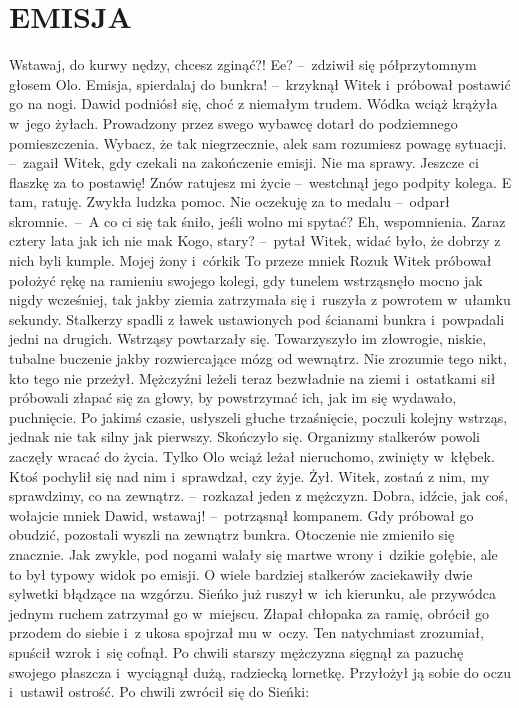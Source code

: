 \documentclass[../MAIN.tex]{subfiles}
\begin{document}
\section*{EMISJA}
\sd
\xx Wstawaj, do kurwy nędzy, chcesz zginąć?!
\xx Ee? --~zdziwił się półprzytomnym głosem Olo.
\xx Emisja, spierdalaj do bunkra! --~krzyknął Witek i~próbował postawić go na nogi.
\qd
\dd
Dawid podniósł się, choć z niemałym trudem. Wódka wciąż krążyła w~jego żyłach. Prowadzony przez swego wybawcę dotarł do podziemnego pomieszczenia.
\dd
\sd
\xx Wybacz, że tak niegrzecznie, ale\3k sam rozumiesz powagę sytuacji. --~zagaił Witek, gdy czekali na zakończenie emisji.
\xx Nie ma sprawy. Jeszcze ci flaszkę za to postawię! Znów ratujesz mi życie --~westchnął jego podpity kolega.
\xx E tam, ratuję. Zwykła ludzka pomoc. Nie oczekuję za to medalu --~odparł skromnie.~--~A co ci się tak śniło, jeśli wolno mi spytać?
\xx Eh, wspomnienia. Zaraz cztery lata jak ich nie ma\3k
\xx Kogo, stary? --~pytał Witek, widać było, że dobrzy z nich byli kumple.
\xx Mojej żony i~córki\3k To przeze mnie\3k
\xx Rozu\3k
\qd
\hspace{4.8em} Witek próbował położyć rękę na ramieniu swojego kolegi, gdy tunelem wstrząsnęło mocno jak nigdy wcześniej, tak jakby ziemia zatrzymała się i~ruszyła z powrotem w~ułamku sekundy. Stalkerzy spadli z ławek ustawionych pod ścianami bunkra i~powpadali jedni na drugich. Wstrząsy powtarzały się. Towarzyszyło im złowrogie, niskie, tubalne buczenie jakby rozwiercające mózg od wewnątrz. Nie zrozumie tego nikt, kto tego nie przeżył. Mężczyźni leżeli teraz bezwładnie na ziemi i~ostatkami sił próbowali złapać się za głowy, by powstrzymać ich, jak im się wydawało, puchnięcie. Po jakimś czasie, usłyszeli głuche trzaśnięcie, poczuli kolejny wstrząs, jednak nie tak silny jak pierwszy. Skończyło się. Organizmy stalkerów powoli zaczęły wracać do życia. Tylko Olo wciąż leżał nieruchomo, zwinięty w~kłębek. Ktoś pochylił się nad nim i~sprawdzał, czy żyje. Żył.
\dd
\sd
\xx Witek, zostań z nim, my sprawdzimy, co na zewnątrz. --~rozkazał jeden z mężczyzn.
\xx Dobra, idźcie, jak coś, wołajcie mnie\3k Dawid, wstawaj! --~potrząsnął kompanem.
\qd
\dd
\mm
Gdy próbował go obudzić, pozostali wyszli na zewnątrz bunkra. Otoczenie nie zmieniło się znacznie. Jak zwykle, pod nogami walały się martwe wrony i~dzikie gołębie, ale to był typowy widok po emisji. O wiele bardziej stalkerów zaciekawiły dwie sylwetki błądzące na wzgórzu. Sieńko już ruszył w~ich kierunku, ale przywódca jednym ruchem zatrzymał go w~miejscu. Złapał chłopaka za ramię, obrócił go przodem do siebie i~z ukosa spojrzał mu w~oczy. Ten natychmiast zrozumiał, spuścił wzrok i~się cofnął. Po chwili starszy mężczyzna sięgnął za pazuchę swojego płaszcza i~wyciągnął dużą, radziecką lornetkę. Przyłożył ją sobie do oczu i~ustawił ostrość. Po chwili zwrócił się do Sieńki:
\end{document}
